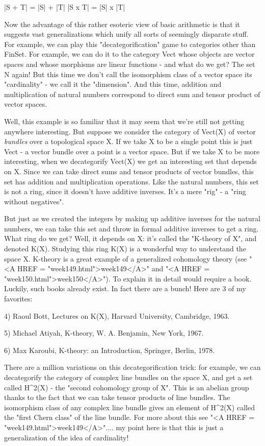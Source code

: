 |S + T| = |S| + |T|
|S x T| = |S| x |T|

Now the advantage of this rather esoteric view of basic arithmetic is
that it suggests vast generalizations which unify all sorts of seemingly
disparate stuff.  For example, we can play this
"decategorification" game to categories other than FinSet.
For example, we can do it to the category Vect whose objects are vector
spaces and whose morphisms are linear functions - and what do we get?
The set N again!  But this time we don't call the isomorphism class of a
vector space its "cardinality" - we call it the
"dimension".  And this time, addition and multiplication of
natural numbers correspond to direct sum and tensor product of vector
spaces.

Well, this example is so familiar that it may seem that we're still not
getting anywhere interesting.  But suppose we consider the category of
Vect(X) of vector \emph{bundles} over a topological space X.  If we take X
to be a single point this is just Vect - a vector bundle over a point is
a vector space.  But if we take X to be more interesting, when we 
decategorify Vect(X) we get an interesting set that depends on X.  Since 
we can take direct sums and tensor products of vector bundles, this 
set has addition and multiplication operations.  Like the natural numbers,
this set is not a ring, since it doesn't have additive inverses.  It's a 
mere "rig" - a "ring without negatives".

But just as we created the integers by making up additive inverses for
the natural numbers, we can take this set and throw in formal additive
inverses to get a ring.  What ring do we get?  Well, it depends on X:
it's called the "K-theory of X", and denoted K(X).  Studying
this ring K(X) is a wonderful way to understand the space X.  K-theory
is a great example of a generalized cohomology theory (see "<A HREF
= "week149.html">week149</A>" and "<A HREF =
"week150.html">week150</A>").  To explain it in detail would
require a book.  Luckily, such books already exist.  In fact there are a
bunch!  Here are 3 of my favorites:

4) Raoul Bott, Lectures on K(X), Harvard University, Cambridge, 1963.

5) Michael Atiyah, K-theory, W. A. Benjamin, New York, 1967.

6) Max Karoubi, K-theory: an Introduction, Springer, Berlin, 1978.

There are a million variations on this decategorification trick: for 
example, we can decategorify the category of complex line bundles on 
the space X, and get a set called H^{2}(X) - 
the "second cohomology 
group of X".   This is an abelian group thanks to the fact that we 
can take tensor products of line bundles.  The isomorphism class of 
any complex line bundle gives an element of H^{2}(X) 
called the "first 
Chern class" of the line bundle.  For more about this see "<A HREF = "week149.html">week149</A>"....
my point here is that this is just a generalization of the idea of
cardinality!

